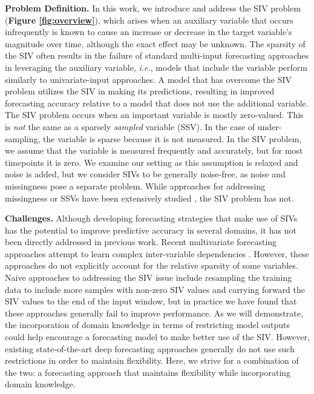 \documentclass[letterpaper]{article}
\begin{document}
\textbf{Problem Definition.} In this work, we introduce and address the SIV problem (\textbf{Figure \ref{fig:overview}}), which arises when an auxiliary variable that occurs infrequently is known to cause an increase or decrease in the target variable's magnitude over time, although the exact effect may be unknown. The sparsity of the SIV often results in the failure of standard multi-input forecasting approaches in leveraging the auxiliary variable, \textit{i.e.}, models that include the variable perform similarly to univariate-input approaches. A model that has overcome the SIV problem utilizes the SIV in making its predictions, resulting in improved forecasting accuracy relative to a model that does not use the additional variable. The SIV problem occurs when an important variable is mostly zero-valued. This is \textit{not} the same as a sparsely \textit{sampled} variable (SSV). In the case of under-sampling, the variable is sparse because it is not measured. In the SIV problem, we assume that the variable is measured frequently and accurately, but for most timepoints it is zero. We examine our setting as this assumption is relaxed and noise is added, but we consider SIVs to be generally noise-free, as noise and missingness pose a separate problem. While approaches for addressing missingness or SSVs have been extensively studied \cite{missing}, the SIV problem has not.


\textbf{Challenges.} Although developing forecasting strategies that  make use of SIVs has the potential to improve predictive accuracy in several domains, it has not been directly addressed in previous work.  Recent multivariate forecasting approaches attempt to learn complex inter-variable dependencies \cite{attention1,cnn2,sharedmulti}. However, these approaches do not explicitly account for the relative sparsity of some variables. Naive approaches to addressing the SIV issue include resampling the training data to include more samples with non-zero SIV values and carrying forward the SIV values to the end of the input window, but in practice we have found that these approaches generally fail to improve performance.  As we will demonstrate, the incorporation of domain knowledge in terms of restricting model outputs could help encourage a forecasting model to make better use of the SIV. However, existing state-of-the-art deep forecasting approaches generally do not use such restrictions in order to maintain flexibility. Here, we strive for a combination of the two: a forecasting approach that maintains flexibility while incorporating domain knowledge.
\end{document}

